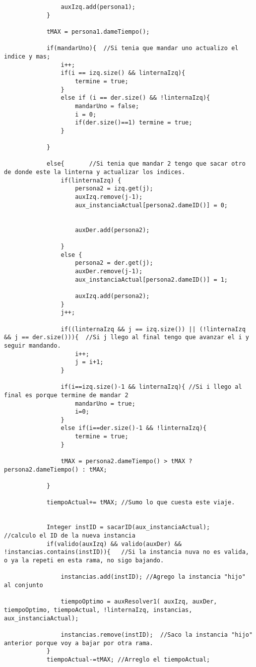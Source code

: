 \begin{lstlisting}
				auxIzq.add(persona1);
			}

			tMAX = persona1.dameTiempo();

			if(mandarUno){	//Si tenia que mandar uno actualizo el indice y mas;
				i++;
				if(i == izq.size() && linternaIzq){
					termine = true;
				}
				else if (i == der.size() && !linternaIzq){
					mandarUno = false;
					i = 0;
					if(der.size()==1) termine = true;
				}

			}

			else{		//Si tenia que mandar 2 tengo que sacar otro de donde este la linterna y actualizar los indices.
				if(linternaIzq) {
					persona2 = izq.get(j);
					auxIzq.remove(j-1);
					aux_instanciaActual[persona2.dameID()] = 0;

					
					auxDer.add(persona2);
					
				}
				else {
					persona2 = der.get(j);
					auxDer.remove(j-1);
					aux_instanciaActual[persona2.dameID()] = 1;
					
					auxIzq.add(persona2);
				}
				j++;

				if((linternaIzq && j == izq.size()) || (!linternaIzq && j == der.size())){	//Si j llego al final tengo que avanzar el i y seguir mandando.
					i++;
					j = i+1;
				}

				if(i==izq.size()-1 && linternaIzq){	//Si i llego al final es porque termine de mandar 2
					mandarUno = true;
					i=0;
				}
				else if(i==der.size()-1 && !linternaIzq){
					termine = true;
				}

				tMAX = persona2.dameTiempo() > tMAX ? persona2.dameTiempo() : tMAX;

			}

			tiempoActual+= tMAX; //Sumo lo que cuesta este viaje.
			
			
			Integer instID = sacarID(aux_instanciaActual);			//calculo el ID de la nueva instancia				
			if(valido(auxIzq) && valido(auxDer) && !instancias.contains(instID)){	//Si la instancia nuva no es valida, o ya la repeti en esta rama, no sigo bajando.
			
				instancias.add(instID);	//Agrego la instancia "hijo" al conjunto 
				
				tiempoOptimo = auxResolver1( auxIzq, auxDer, tiempoOptimo, tiempoActual, !linternaIzq, instancias, aux_instanciaActual);
				
				instancias.remove(instID);	//Saco la instancia "hijo" anterior porque voy a bajar por otra rama.
			}
			tiempoActual-=tMAX;	//Arreglo el tiempoActual;


\end{lstlisting}
